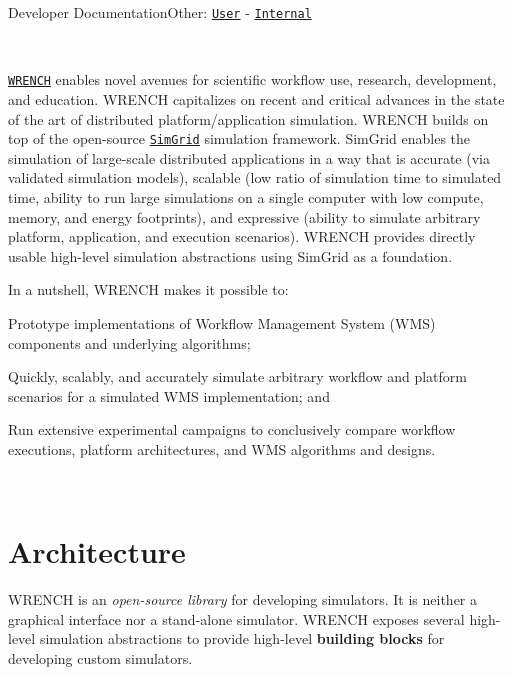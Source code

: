 Developer DocumentationOther\+: \href{../user/}{\tt User} -\/ \href{../internal/}{\tt Internal}

 ~\newline
~\newline


\href{http://wrench-project.org}{\tt W\+R\+E\+N\+CH} enables novel avenues for scientific workflow use, research, development, and education. W\+R\+E\+N\+CH capitalizes on recent and critical advances in the state of the art of distributed platform/application simulation. W\+R\+E\+N\+CH builds on top of the open-\/source \href{http://simgrid.gforge.inria.fr}{\tt Sim\+Grid} simulation framework. Sim\+Grid enables the simulation of large-\/scale distributed applications in a way that is accurate (via validated simulation models), scalable (low ratio of simulation time to simulated time, ability to run large simulations on a single computer with low compute, memory, and energy footprints), and expressive (ability to simulate arbitrary platform, application, and execution scenarios). W\+R\+E\+N\+CH provides directly usable high-\/level simulation abstractions using Sim\+Grid as a foundation.

In a nutshell, W\+R\+E\+N\+CH makes it possible to\+:


\begin{DoxyItemize}
\item Prototype implementations of Workflow Management System (W\+MS) components and underlying algorithms;
\item Quickly, scalably, and accurately simulate arbitrary workflow and platform scenarios for a simulated W\+MS implementation; and
\item Run extensive experimental campaigns to conclusively compare workflow executions, platform architectures, and W\+MS algorithms and designs.
\end{DoxyItemize}

~\newline
\hypertarget{index_overview-architecture}{}\section{Architecture}\label{index_overview-architecture}
W\+R\+E\+N\+CH is an {\itshape open-\/source library} for developing simulators. It is neither a graphical interface nor a stand-\/alone simulator. W\+R\+E\+N\+CH exposes several high-\/level simulation abstractions to provide high-\/level {\bfseries building blocks} for developing custom simulators.

